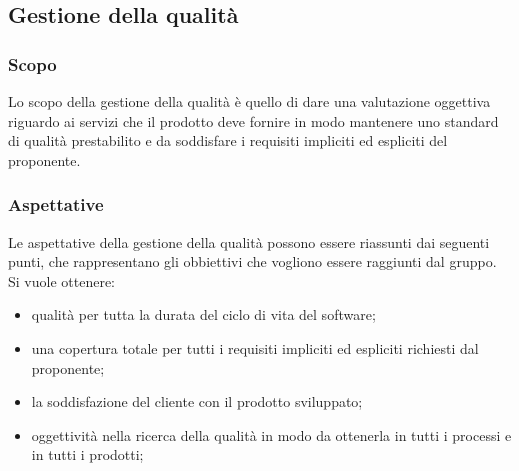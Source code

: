 \subsection{Gestione della qualità}
\subsubsection{Scopo}
Lo scopo della gestione della qualità è quello di dare una valutazione oggettiva riguardo ai servizi che il prodotto deve fornire in modo mantenere uno standard di qualità prestabilito e da soddisfare i requisiti impliciti ed espliciti del proponente.
\subsubsection{Aspettative}
Le aspettative della gestione della qualità possono essere riassunti dai seguenti punti, che rappresentano gli obbiettivi che vogliono essere raggiunti dal gruppo. Si vuole ottenere:
\begin{itemize}
	\item qualità per tutta la durata del ciclo di vita del software;
	\item una copertura totale per tutti i requisiti impliciti ed espliciti richiesti dal proponente;
	\item la soddisfazione del cliente con il prodotto sviluppato;
	\item oggettività nella ricerca della qualità in modo da ottenerla in tutti i processi e in tutti i prodotti;
\end{itemize}
